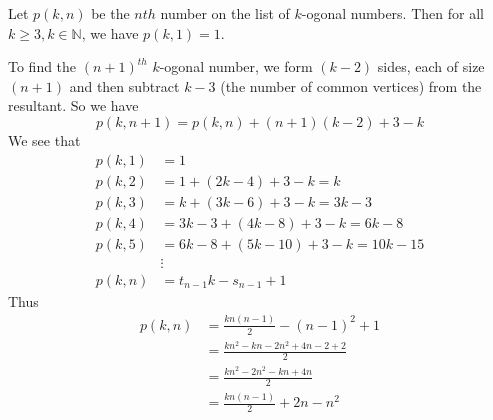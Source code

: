 \begin{questions}
    \begin{solution}
        Let $p(k,n)$ be the $nth$ number on the list of
        $k$-ogonal numbers. Then for all $k\ge3,
        k\in\mathbb{N}$, we have $p(k,1)=1$.

        To find the $(n+1)^{th}$ $k$-ogonal number, we 
        form $(k-2)$ sides, each of size $(n+1)$ and then 
        subtract $k-3$ (the number of common vertices)
        from the resultant. So we have
        $$p(k,n+1)=p(k,n)+(n+1)(k-2)+3-k$$
        We see that
        \begin{align*}
            p(k,1) &= 1\\
            p(k,2) &= 1+(2k-4)+3-k=k\\
            p(k,3) &= k+(3k-6)+3-k=3k-3\\
            p(k,4) &= 3k-3+(4k-8)+3-k=6k-8\\
            p(k,5) &= 6k-8+(5k-10)+3-k=10k-15\\
            &\vdots\\
            p(k,n) &= t_{n-1}k-s_{n-1} +1
        \end{align*}
        Thus
        \begin{align*}
            p(k,n) &= \frac{kn(n-1)}{2}-(n-1)^2+1\\
                   &= \frac{kn^2-kn-2n^2+4n-2+2}{2}\\
                   &= \frac{kn^2-2n^2-kn+4n}{2}\\
                   &= \frac{kn(n-1)}{2}+2n-n^2\\
        \end{align*}
        \qedsymbol
    \end{solution}
\end{questions}
